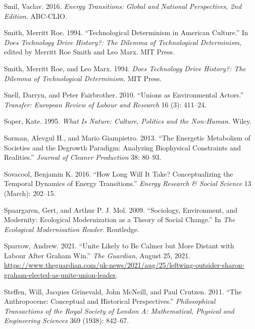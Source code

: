 \documentclass[a4paper, nobind]{templates/ociamthesis}
\newlength{\cslhangindent}
\newenvironment{CSLReferences}[2] %
 {%
  \setlength{\parindent}{0pt}
  \ifodd #1
  \let\oldpar\par
  \def\par{\hangindent=\cslhangindent\oldpar}
  \fi
  \setlength{\parskip}{1mm}
  \setlength{\baselineskip}{6mm}
 }%
 {}
\begin{document}
\begin{CSLReferences}{1}{0}
\leavevmode{}%
Smil, Vaclav. 2016. \emph{Energy {Transitions}: {Global} and {National Perspectives}, 2nd {Edition}}. {ABC-CLIO}.

\leavevmode{}%
Smith, Merritt Roe. 1994. {``Technological {Determinism} in {American Culture}.''} In \emph{Does {Technology Drive History}?: {The Dilemma} of {Technological Determinism}}, edited by Merritt Roe Smith and Leo Marx. {MIT Press}.

\leavevmode{}%
Smith, Merritt Roe, and Leo Marx. 1994. \emph{Does {Technology Drive History}?: {The Dilemma} of {Technological Determinism}}. {MIT Press}.

\leavevmode{}%
Snell, Darryn, and Peter Fairbrother. 2010. {``Unions as Environmental Actors.''} \emph{Transfer: European Review of Labour and Research} 16 (3): 411--24.

\leavevmode{}%
Soper, Kate. 1995. \emph{What Is {Nature}: {Culture}, {Politics} and the {Non-Human}}. {Wiley}.

\leavevmode{}%
Sorman, Alevgul H., and Mario Giampietro. 2013. {``The Energetic Metabolism of Societies and the Degrowth Paradigm: Analyzing Biophysical Constraints and Realities.''} \emph{Journal of Cleaner Production} 38: 80--93.

\leavevmode{}%
Sovacool, Benjamin K. 2016. {``How Long Will It Take? {Conceptualizing} the Temporal Dynamics of Energy Transitions.''} \emph{Energy Research \& Social Science} 13 (March): 202--15.

\leavevmode{}%
Spaargaren, Gert, and Arthur P. J. Mol. 2009. {``Sociology, {Environment}, and {Modernity}: {Ecological Modernization} as a {Theory} of {Social Change}.''} In \emph{The {Ecological Modernisation Reader}}. {Routledge}.

\leavevmode{}%
Sparrow, Andrew. 2021. {``Unite Likely to Be Calmer but More Distant with {Labour} After {Graham} Win.''} \emph{The Guardian}, August 25, 2021. \url{https://www.theguardian.com/uk-news/2021/aug/25/leftwing-outsider-sharon-graham-elected-as-unite-union-leader}.

\leavevmode{}%
Steffen, Will, Jacques Grinevald, John McNeill, and Paul Crutzen. 2011. {``The {Anthropocene}: Conceptual and Historical Perspectives.''} \emph{Philosophical Transactions of the Royal Society of London A: Mathematical, Physical and Engineering Sciences} 369 (1938): 842--67.


\end{CSLReferences}
\end{document}
